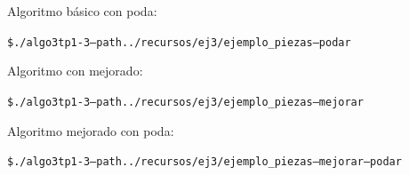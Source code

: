 \documentclass[11pt,a4paper]{article}
\begin{document}
Algoritmo básico con poda:
\begin{alltt}
\$ ./algo3tp1 -3 --path ../recursos/ej3/ejemplo_piezas --podar
\end{alltt}

Algoritmo con mejorado:
\begin{alltt}
\$ ./algo3tp1 -3 --path ../recursos/ej3/ejemplo_piezas --mejorar
\end{alltt}

Algoritmo mejorado con poda:
\begin{alltt}
\$ ./algo3tp1 -3 --path ../recursos/ej3/ejemplo_piezas --mejorar --podar
\end{alltt}
\end{document}
